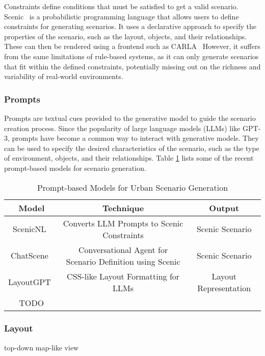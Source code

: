 \documentclass{article}
\begin{document}
Constraints define conditions that must be satisfied to get a valid scenario. Scenic~\cite{fremont2019scenic} is a probabilistic programming language that allows users to define constraints for generating scenarios. It uses a declarative approach to specify the properties of the scenario, such as the layout, objects, and their relationships. These can then be rendered using a frontend such as CARLA~\cite{dosovitskiy2017carla} However, it suffers from the same limitations of rule-based systems, as it can only generate scenarios that fit within the defined constraints, potentially missing out on the richness and variability of real-world environments.

\subsubsection{Prompts}

Prompts are textual cues provided to the generative model to guide the scenario creation process. Since the popularity of large language models (LLMs) like GPT-3, prompts have become a common way to interact with generative models. They can be used to specify the desired characteristics of the scenario, such as the type of environment, objects, and their relationships. Table \ref{tab:prompt_based_models} lists some of the recent prompt-based models for scenario generation.

\begin{table}[ht]
\centering
\begin{tabular}{|c|c|c|}
\hline
\textbf{Model} & \textbf{Technique} & \textbf{Output} \\ \hline
ScenicNL~\cite{elmaaroufi2024scenicnl} & Converts LLM Prompts to Scenic Constraints & Scenic Scenario \\ \hline
ChatScene~\cite{zhang2024chatscene} & Conversational Agent for Scenario Definition using Scenic & Scenic Scenario \\ \hline
LayoutGPT~\cite{feng2023layoutgpt} & CSS-like Layout Formatting for LLMs & Layout Representation \\ \hline
TODO
\end{tabular}
\caption{Prompt-based Models for Urban Scenario Generation}
\label{tab:prompt_based_models}
\end{table}

\subsubsection{Layout}
top-down map-like view
\end{document}
